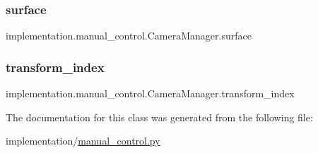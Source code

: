 \subsubsection{\texorpdfstring{surface}{surface}}
{\footnotesize\ttfamily implementation.\+manual\+\_\+control.\+Camera\+Manager.\+surface}

\mbox{\label{classimplementation_1_1manual__control_1_1_camera_manager_ad13f1309b723167fd9f621e1d787dc62}} 
\subsubsection{\texorpdfstring{transform\+\_\+index}{transform\_index}}
{\footnotesize\ttfamily implementation.\+manual\+\_\+control.\+Camera\+Manager.\+transform\+\_\+index}



The documentation for this class was generated from the following file\+:\begin{DoxyCompactItemize}
\item 
implementation/\hyperlink{manual__control_8py}{manual\+\_\+control.\+py}\end{DoxyCompactItemize}
